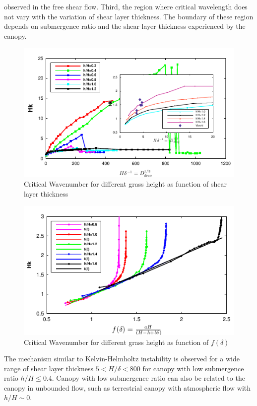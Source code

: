 \documentclass[aps,prl,twocolumn,showpacs,superscriptaddress,groupedaddress,10pt]{revtex4-1}  %
\begin{document}
observed in the free shear flow. Third, the region where critical wavelength does not vary with the variation of shear layer thickness. The boundary of these region depends on 
submergence ratio and the shear layer thickness experienced by the canopy.
\begin{figure}[htb]
\includegraphics[]{K_vs_shear_width_noshear}
\caption{Critical Wavenumber for different grass height as function of shear layer thickness}
\label{K_vs_shear}
\end{figure}
\begin{figure}[htb]
\includegraphics[]{Low_drag_k}
\caption{Critical Wavenumber for different grass height as function of $f(\delta)$}
\label{Low_drag_k}
\end{figure}
\newline
The mechanism similar to Kelvin-Helmholtz instability is observed for a wide range of shear layer thickness $5 <H/\delta <800$ for canopy with low submergence ratio $h/H\leq 0.4$.
Canopy with low submergence ratio can also be related to the canopy in unbounded flow, such as terrestrial canopy with atmospheric flow with $h/H\sim 0$. 
\end{document}
